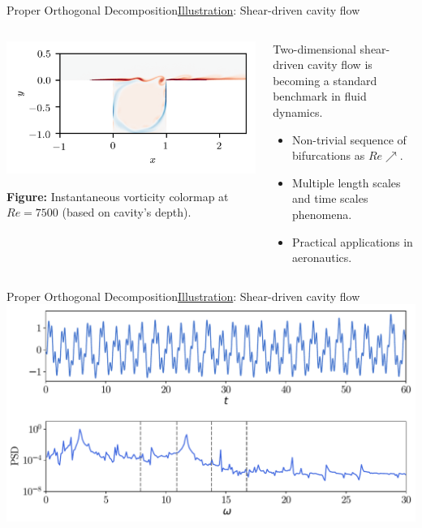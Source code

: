 \documentclass[usenames,dvipsnames,svgnames,10pt,aspectratio=169]{beamer}
\begin{document}
\begin{frame}[t, c]{Proper Orthogonal Decomposition}{\underline{Illustration}: Shear-driven cavity flow}
	\begin{columns}
		\begin{column}{.45\textwidth}
			\begin{center}
				\includegraphics[width=\textwidth]{shear-driven-cavity}
			\end{center}
			\textbf{Figure:} Instantaneous vorticity colormap at $Re=7500$ (based on cavity's depth).
		\end{column}
		\begin{column}{.55\textwidth}
			Two-dimensional shear-driven cavity flow is becoming a standard benchmark in fluid dynamics.
			\medskip
			\begin{itemize}
				\item Non-trivial sequence of bifurcations as $Re \nearrow$.
				\medskip
				\item Multiple length scales and time scales phenomena.
				\medskip
				\item Practical applications in aeronautics.
			\end{itemize}
			\vspace{1cm}
		\end{column}
	\end{columns}

	 \vspace{1cm}
\end{frame}


\begin{frame}[t, c]{Proper Orthogonal Decomposition}{\underline{Illustration}: Shear-driven cavity flow}
	\centering
	\includegraphics[width=.75\textwidth]{energy_psd}

	\vspace{1cm}
\end{frame}
\end{document}
